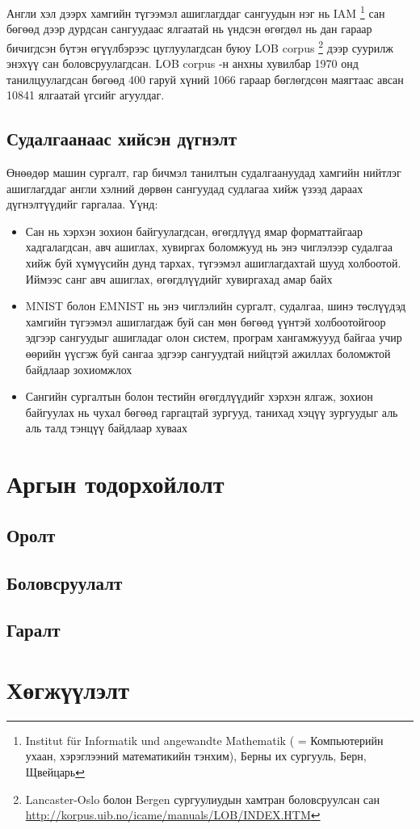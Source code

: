 Англи хэл дээрх хамгийн түгээмэл ашиглагддаг сангуудын нэг нь IAM \footnote{Institut für Informatik und angewandte Mathematik ( = Компьютерийн ухаан, хэрэглээний математикийн тэнхим), Берны их сургууль, Берн, Щвейцарь} сан бөгөөд дээр дурдсан сангуудаас ялгаатай нь үндсэн өгөгдөл нь дан гараар бичигдсэн бүтэн өгүүлбэрээс цуглуулагдсан буюу LOB corpus \cite{lob-corpus} \footnote{Lancaster-Oslo болон Bergen сургуулиудын хамтран боловсруулсан сан \url{http://korpus.uib.no/icame/manuals/LOB/INDEX.HTM}} дээр суурилж энэхүү сан боловсруулагдсан. LOB corpus -н анхны хувилбар 1970 онд танилцуулагдсан бөгөөд 400 гаруй хүний 1066 гараар бөглөгдсөн маягтаас авсан 10841 ялгаатай үгсийг агуулдаг.

\section{Судалгаанаас хийсэн дүгнэлт}

Өнөөдөр машин сургалт, гар бичмэл танилтын судалгаануудад хамгийн нийтлэг ашиглагддаг англи хэлний дөрвөн сангуудад судлагаа хийж үзээд дараах дүгнэлтүүдийг гаргалаа. Үүнд:

\begin{itemize}
	\item Сан нь хэрхэн зохион байгуулагдсан, өгөгдлүүд ямар форматтайгаар хадгалагдсан, авч ашиглах, хувиргах боломжууд нь энэ чиглэлээр судалгаа хийж буй хүмүүсийн дунд тархах, түгээмэл ашиглагдахтай шууд холбоотой. Иймээс санг авч ашиглах, өгөгдлүүдийг хувиргахад амар байх
	\item MNIST болон EMNIST нь энэ чиглэлийн сургалт, судалгаа, шинэ төслүүдэд хамгийн түгээмэл ашиглагдаж буй сан мөн бөгөөд үүнтэй холбоотойгоор эдгээр сангуудыг ашигладаг олон систем, програм хангамжуууд байгаа учир өөрийн үүсгэж буй сангаа эдгээр сангуудтай нийцтэй ажиллах боломжтой байдлаар зохиомжлох
	\item Сангийн сургалтын болон тестийн өгөгдлүүдийг хэрхэн ялгаж, зохион байгуулах нь чухал бөгөөд гаргацтай зургууд, танихад хэцүү зургуудыг аль аль талд тэнцүү байдлаар хуваах
\end{itemize}

\chapter{Аргын тодорхойлолт}

\section{Оролт}

\section{Боловсруулалт}

\section{Гаралт}

\chapter{Хөгжүүлэлт}
